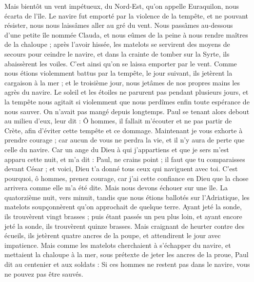 \begin{multicols}{2}
\TextTitle{[La tempête]}
Mais bientôt un vent impétueux, du Nord-Est, qu'on appelle Euraquilon, nous écarta de l'île.
Le navire fut emporté par la violence de la tempête, et ne pouvant résister, nous nous laissâmes aller au gré du vent.
Nous passâmes au-dessous d’une petite île nommée Clauda, et nous eûmes de la peine à nous rendre maîtres de la chaloupe ;
après l’avoir hissée, les matelots se servirent des moyens de secours pour ceindre le navire, et dans la crainte de tomber sur la Syrte, ils abaissèrent les voiles. C’est ainsi qu’on se laissa emporter par le vent.
Comme nous étions violemment battus par la tempête, le jour suivant, ils jetèrent la cargaison à la mer ;
et le troisième jour, nous jetâmes de nos propres mains les agrès du navire.
Le soleil et les étoiles ne parurent pas pendant plusieurs jours, et la tempête nous agitait si violemment que nous perdîmes enfin toute espérance de nous sauver.
On n’avait pas mangé depuis longtemps. Paul se tenant alors debout au milieu d'eux, leur dit : Ô hommes, il fallait m’écouter et ne pas partir de Crète, afin d’éviter cette tempête et ce dommage.
Maintenant je vous exhorte à prendre courage ; car aucun de vous ne perdra la vie, et il n’y aura de perte que celle du navire.
Car un ange du Dieu à qui j’appartiens et que je sers m’est apparu cette nuit,
et m’a dit : Paul, ne crains point ; il faut que tu comparaisses devant César ; et voici, Dieu t'a donné tous ceux qui naviguent avec toi.
C'est pourquoi, ô hommes, prenez courage, car j'ai cette confiance en Dieu que la chose arrivera comme elle m'a été dite.
Mais nous devons échouer sur une île.
La quatorzième nuit, vers minuit, tandis que nous étions ballotés sur l’Adriatique, les matelots soupçonnèrent qu’on approchait de quelque terre.
Ayant jeté la sonde, ils trouvèrent vingt brasses ; puis étant passés un peu plus loin, et ayant encore jeté la sonde, ils trouvèrent quinze brasses.
Mais craignant de heurter contre des écueils, ils jetèrent quatre ancres de la poupe, et attendirent le jour avec impatience.
Mais comme les matelots cherchaient à s’échapper du navire, et mettaient la chaloupe à la mer, sous prétexte de jeter les ancres de la proue,
Paul dit au centenier et aux soldats : Si ces hommes ne restent pas dans le navire, vous ne pouvez pas être sauvés.

\end{multicols}
